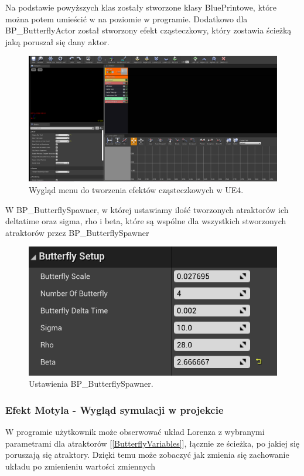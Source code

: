 \documentclass[a4paper,12pt,reqno]{article}
\begin{document}
Na podstawie powyższych klas zostały stworzone klasy BluePrintowe, które można potem umieścić w na poziomie w programie. Dodatkowo dla BP\_ButterflyActor został stworzony efekt cząsteczkowy, który zostawia ścieżką jaką poruszał się dany aktor.
\begin{figure}[H]%
\centering
\includegraphics[width=0.9\columnwidth]{graphics/butterfly/ButterflyParticleSystem.png}
\caption{Wygląd menu do tworzenia efektów cząsteczkowych w UE4. 
\label{BPExample}}%
%
\qquad
\end{figure} 


W BP\_ButterflySpawner, w której ustawiamy ilość tworzonych atraktorów ich deltatime oraz sigma, rho i beta, które są wspólne dla wszystkich stworzonych atraktorów przez BP\_ButterflySpawner

\begin{figure}[H]%
\centering
\includegraphics[width=0.7\columnwidth]{graphics/butterfly/ButterflySpawner.png}
\caption{Ustawienia BP\_ButterflySpawner.
\label{BPExample}}%
%
\qquad
\end{figure} 
\newpage
\subsubsection{Efekt Motyla - Wygląd symulacji w projekcie}

W programie użytkownik może obserwować układ Lorenza z wybranymi parametrami dla atraktorów [\ref{ButterflyVariables}], łącznie ze ścieżka, po jakiej się poruszają się atraktory. Dzięki temu może zobaczyć jak zmienia się zachowanie układu po zmienieniu wartości zmiennych
\end{document}
